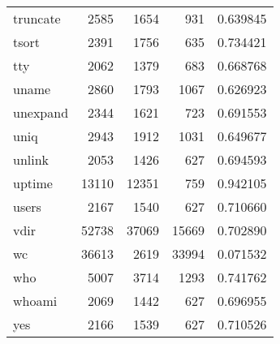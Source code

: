 \begin{longtable}{lrrrr}
truncate  &                     2585 &         1654 &           931 &                 0.639845 \\
tsort     &                     2391 &         1756 &           635 &                 0.734421 \\
tty       &                     2062 &         1379 &           683 &                 0.668768 \\
uname     &                     2860 &         1793 &          1067 &                 0.626923 \\
unexpand  &                     2344 &         1621 &           723 &                 0.691553 \\
uniq      &                     2943 &         1912 &          1031 &                 0.649677 \\
unlink    &                     2053 &         1426 &           627 &                 0.694593 \\
uptime    &                    13110 &        12351 &           759 &                 0.942105 \\
users     &                     2167 &         1540 &           627 &                 0.710660 \\
vdir      &                    52738 &        37069 &         15669 &                 0.702890 \\
wc        &                    36613 &         2619 &         33994 &                 0.071532 \\
who       &                     5007 &         3714 &          1293 &                 0.741762 \\
whoami    &                     2069 &         1442 &           627 &                 0.696955 \\
yes       &                     2166 &         1539 &           627 &                 0.710526 \\
\end{longtable}
